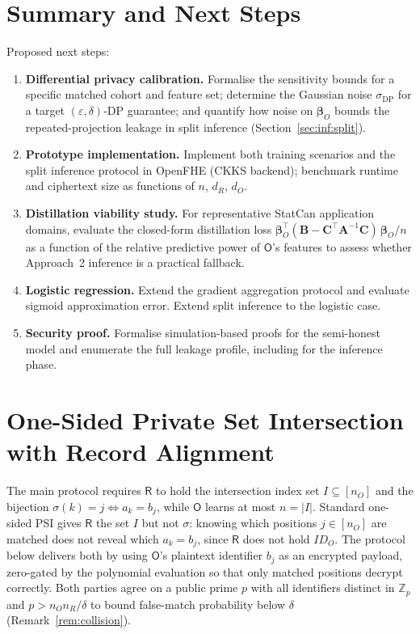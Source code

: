 \documentclass[12pt]{article}
\theoremstyle{definition}
\theoremstyle{plain}
\newcommand{\bbeta}{\boldsymbol{\beta}}
\newcommand{\bA}{\mathbf{A}}
\newcommand{\bB}{\mathbf{B}}
\newcommand{\bC}{\mathbf{C}}
\newcommand{\Party}[1]{\textsf{#1}}
\begin{document}
\section{Summary and Next Steps}


\noindent Proposed next steps:

\begin{enumerate}[noitemsep]
  \item \textbf{Differential privacy calibration.} Formalise the sensitivity bounds for a specific matched cohort and feature set; determine the Gaussian noise $\sigma_{\mathrm{DP}}$ for a target $(\varepsilon,\delta)$-DP guarantee; and quantify how noise on $\bbeta_{O}$ bounds the repeated-projection leakage in split inference (Section~\ref{sec:inf:split}).
  \item \textbf{Prototype implementation.} Implement both training scenarios and the split inference protocol in OpenFHE (CKKS backend); benchmark runtime and ciphertext size as functions of $n$, $d_{R}$, $d_{O}$.
  \item \textbf{Distillation viability study.} For representative StatCan application domains, evaluate the closed-form distillation loss $\boldsymbol{\beta}_{O}^{\top}(\bB - \bC^{\top}\bA^{-1}\bC)\,\bbeta_{O}/n$ as a function of the relative predictive power of $\Party{O}$'s features to assess whether Approach~2 inference is a practical fallback.
  \item \textbf{Logistic regression.} Extend the gradient aggregation protocol and evaluate sigmoid approximation error. Extend split inference to the logistic case.
  \item \textbf{Security proof.} Formalise simulation-based proofs for the semi-honest model and enumerate the full leakage profile, including for the inference phase.
\end{enumerate}

\section{One-Sided Private Set Intersection with Record Alignment}
\label{app:psi}

The main protocol requires $\Party{R}$ to hold the intersection index set
$I \subseteq [n_O]$ and the bijection $\sigma(k) = j \iff a_k = b_j$,
while $\Party{O}$ learns at most $n = |I|$. Standard one-sided PSI gives
$\Party{R}$ the set $I$ but not $\sigma$: knowing which positions $j \in
[n_O]$ are matched does not reveal which $a_k = b_j$, since $\Party{R}$
does not hold $\mathit{ID}_O$. The protocol below delivers both by using
$\Party{O}$'s plaintext identifier $b_j$ as an encrypted payload, zero-gated
by the polynomial evaluation so that only matched positions decrypt
correctly. Both parties agree on a public prime $p$ with all identifiers
distinct in $\mathbb{Z}_p$ and $p > n_O n_R / \delta$ to bound false-match
probability below $\delta$ (Remark~\ref{rem:collision}).
\end{document}

